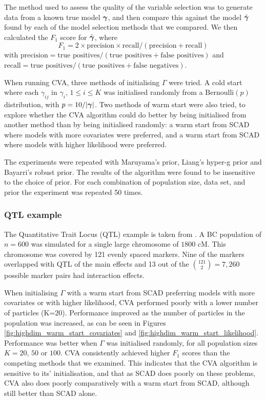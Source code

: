 		

The method used to assess the quality of the variable selection was to generate data from a known true model
${\boldsymbol \gamma}$,
and then compare this against the model $\hat{{\boldsymbol \gamma}}$ found by each of the model selection methods that we 
compared.
We then calculated the $F_1$ score for $\hat{{\boldsymbol \gamma}}$,
where
$$F_1 = 2 \times \text{precision} \times \text{recall} / (\text{precision} + \text{recall})$$ with
$\text{precision} = \text{true positives} / (\text{true positives} + \text{false positives})$ and
$\text{recall} = \text{true positives} / (\text{true positives} + \text{false negatives})$.

When running CVA,
three methods of initialising $\Gamma$ were tried.
A cold start where each $\gamma_{ij}$ in $\gamma_i$, $1 \leq i \leq K$ was initialised randomly from a
$\text{Bernoulli}(p)$ distribution, with $p = 10 / |{\boldsymbol \gamma}|$.
Two methods of warm start were also tried, to explore whether the CVA algorithm could do better by being
initialised from another method than by being initialised randomly: 
a warm start from SCAD where models with more covariates were preferred, and
a warm start from SCAD where models with higher likelihood were preferred.

The experiments were repeated with Maruyama's prior, Liang's hyper-g prior and Bayarri's robust prior.
The results of the algorithm were found to be insensitive to the choice of prior.
For each combination of population size, data set, and prior the experiment was repeated 50 times.

\subsubsection{QTL example}
The Quantitative Trait Locus (QTL) example is taken from \cite{Xu2007}. A BC population of $n=600$ was
simulated for a single large chromosome of $1800$ cM. This chromosome was covered by 121 evenly spaced
markers. Nine of the markers overlapped with QTL of the main effects and 13 out of the $\binom{121} 2 = 7,260$
possible marker pairs had interaction effects.

When initialising $\Gamma$ with a warm start from SCAD preferring models with more covariates or with higher
likelihood, CVA performed poorly with a lower number of particles (K=$20$). Performance improved as the number
of particles in the population was increased, as can be seen in Figures
\ref{fig:highdim_warm_start_covariates} and \ref{fig:highdim_warm_start_likelihood}. Performance was better
when $\Gamma$ was initialised randomly, for all population sizes $K=20$, $50$ or $100$.  CVA consistently
achieved higher $F_1$ scores than the competing methods that we examined. This indicates that the CVA
algorithm is sensitive to its' initialisation, and that as SCAD does poorly on these problems, CVA also does
poorly comparatively with a warm start from SCAD, although still better than SCAD alone.

